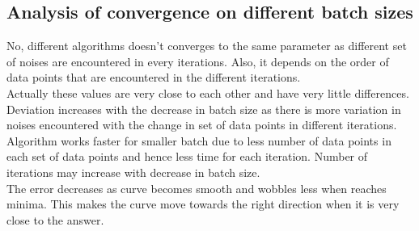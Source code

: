 \documentclass[12pt]{article}
\begin{document}
\subsection{Analysis of convergence on different batch sizes} No, different algorithms doesn't converges to the same parameter as different set of noises are encountered in every iterations. Also, it depends on the order of data points that are encountered in the different iterations.\\
Actually these values are very close to each other and have very little differences. Deviation increases with the decrease in batch size as there is more variation in noises encountered with the change in set of data points in different iterations.\\
Algorithm works faster for smaller batch due to less number of data points in each set of data points and hence less time for each iteration. Number of iterations may increase with decrease in batch size.\\
The error decreases as curve becomes smooth and wobbles less when reaches minima. This makes the curve move towards the right direction when it is very close to the answer.\\
\end{document}
